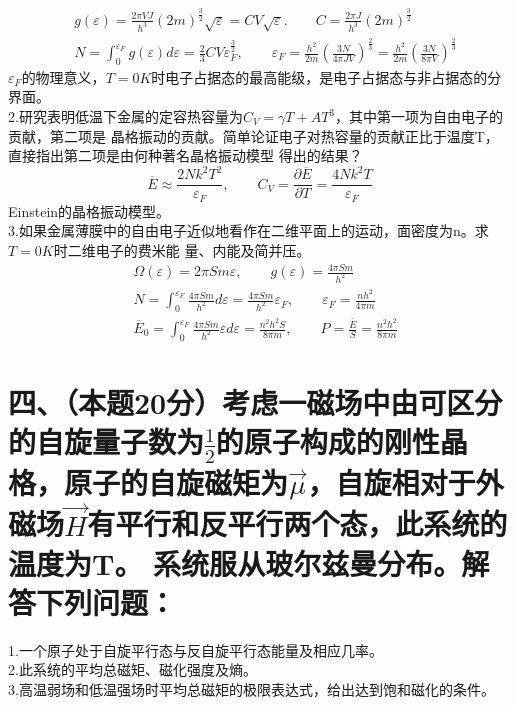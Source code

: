 \documentclass[UTF8]{ctexart}
\begin{document}
\subsection*{}
\begin{equation*}
  \begin{aligned}
     & g(\varepsilon)=\frac{2\pi VJ}{h^3}(2m)^\frac{3}{2}\sqrt{\varepsilon}
    = CV\sqrt{\varepsilon}.\quad\quad
    C =\frac{2\pi J}{h^3}(2m)^\frac{3}{2}                                   \\
     & N=\int_0^{\varepsilon_F}g(\varepsilon)d\varepsilon
    =\frac{2}{3}CV\varepsilon_F^\frac{3}{2},\quad\quad
    \varepsilon_F=\frac{h^2}{2m}(\frac{3N}{4\pi JV})^\frac{2}{3}
    =\frac{h^2}{2m}(\frac{3N}{8\pi V})^\frac{2}{3}
  \end{aligned}
\end{equation*}
$\varepsilon_F$的物理意义，$T=0K$时电子占据态的最高能级，是电子占据态与非占据态的分界面。\\
2.研究表明低温下金属的定容热容量为$C_V=\gamma T+AT^3$，其中第一项为自由电子的贡献，第二项是
晶格振动的贡献。简单论证电子对热容量的贡献正比于温度T，直接指出第二项是由何种著名晶格振动模型
得出的结果？\\
\begin{equation*}
  \overline{E}\approx\frac{2Nk^2T^2}{\varepsilon_F},\quad\quad
  C_V=\frac{\partial\overline{E}}{\partial T}=\frac{4Nk^2T}{\varepsilon_F}
\end{equation*}
Einstein的晶格振动模型。\\
3.如果金属薄膜中的自由电子近似地看作在二维平面上的运动，面密度为n。求$T=0K$时二维电子的费米能
量、内能及简并压。
\begin{equation*}
  \begin{aligned}
     & \Omega(\varepsilon)=2\pi Sm\varepsilon,\quad\quad
    g(\varepsilon)=\frac{4\pi Sm}{h^2}                                                  \\
     & N=\int_0^{\varepsilon_F}\frac{4\pi Sm}{h^2}d\varepsilon
    =\frac{4\pi Sm}{h^2}\varepsilon_F,\quad\quad
    \varepsilon_F=\frac{nh^2}{4\pi m}                                                   \\
     & \overline{E}_0=\int_0^{\varepsilon_F}\frac{4\pi Sm}{h^2}\varepsilon d\varepsilon
    =\frac{n^2h^2S}{8\pi m},\quad\quad
    P=\frac{\overline{E}}{S}=\frac{n^2h^2}{8\pi m}
  \end{aligned}
\end{equation*}
\section*{四、（本题20分）考虑一磁场中由可区分的自旋量子数为$\frac{1}{2}$的原子构成的刚性晶
  格，原子的自旋磁矩为$\vec\mu$，自旋相对于外磁场$\vec H$有平行和反平行两个态，此系统的温度为T。
  系统服从玻尔兹曼分布。解答下列问题：}
1.一个原子处于自旋平行态与反自旋平行态能量及相应几率。\\
2.此系统的平均总磁矩、磁化强度及熵。\\
3.高温弱场和低温强场时平均总磁矩的极限表达式，给出达到饱和磁化的条件。\\
\end{document}
